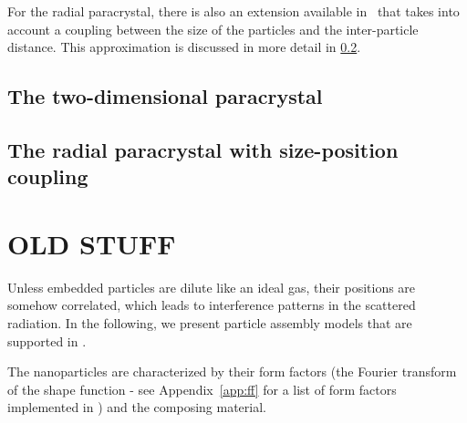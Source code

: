 For the radial paracrystal, there is also an extension available in \BornAgain\ that takes into account a coupling between the size of the particles and
the inter-particle distance. This approximation is discussed in more detail in \ref{sec:sect:sscaparacrystal}.

\subsection{The two-dimensional paracrystal} \label{sec:sect:2dparacrystal}

\subsection{The radial paracrystal with size-position coupling} \label{sec:sect:sscaparacrystal}

\section{OLD STUFF}

Unless embedded particles are dilute like an ideal gas,
their positions are somehow correlated,
which leads to interference patterns in the scattered radiation.
In the following,
we present particle assembly models that are supported in \BornAgain.


The nanoparticles are characterized by their form factors
(\idest the Fourier transform of the shape function - see Appendix~\ref{app:ff} for a list of form factors implemented in \BornAgain) and the composing material.



